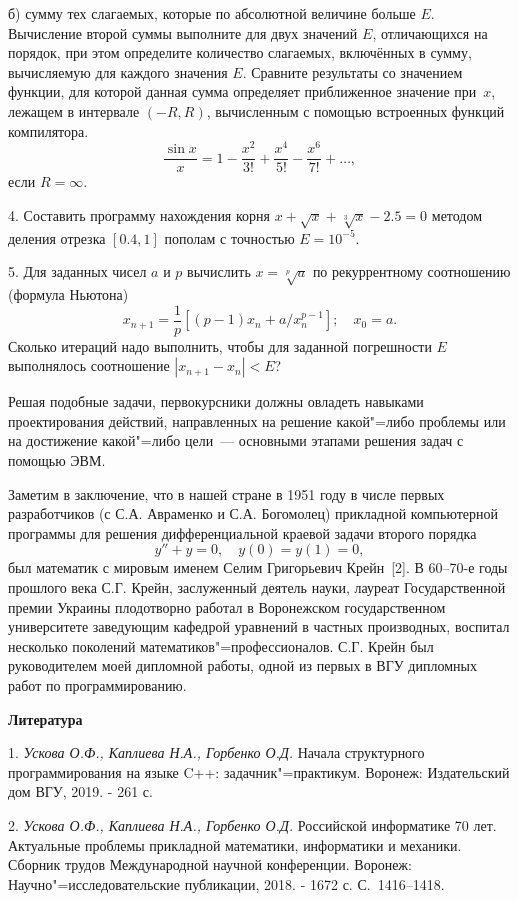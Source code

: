 б) сумму тех слагаемых, которые по абсолютной величине больше $E$. Вычисление второй суммы выполните для двух значений $E$,
отличающихся на порядок, при этом определите количество слагаемых, включённых в сумму, вычисляемую для каждого значения
$E$.
Сравните результаты со значением функции, для которой данная сумма определяет приближенное значение при \,$x$, лежащем в интервале
\linebreak
$(-R, R)$, вычисленным с помощью встроенных функций
ко\-мпилятора.
$$
\frac{\sin x}{x}=1-\frac{x^2}{3!}+\frac{x^4}{5!}-\frac{x^6}{7!}+\dots,
$$
если $R=\infty$.

4. Составить программу нахождения корня $x+\sqrt{x}+\sqrt[3]{x}-2.5=0$ методом деления отрезка $[0.4, 1]$ пополам с точностью
$E=10^{-5}$.

5. Для заданных чисел $a$ и $p$ вычислить $x=\sqrt[p]{a}$ по рекуррентному соотношению (формула Ньютона)
$$
x_{n+1}=\frac{1}{p}[(p-1)x_n+a/x_n^{p-1}]; \quad x_0=a.
$$
Сколько итераций надо выполнить, чтобы для заданной погрешности $E$ выполнялось соотношение $|x_{n+1}-x_n|<E$?

Решая подобные задачи, первокурсники должны овладеть навыками проектирования действий, направленных на решение какой"=либо
проблемы или на достижение какой"=либо цели~--- основными этапами решения задач с помощью ЭВМ.

Заметим в заключение, что в нашей стране в 1951 году в числе первых разработчиков (с С.А. Авраменко и С.А. Богомолец)
прикладной компьютерной программы для решения дифференциальной краевой задачи второго порядка
$$
y''+y=0, \quad y(0)=y(1)=0,
$$
был математик с мировым именем Селим Григорьевич \linebreak Крейн~[2].
В 60--70-е годы прошлого века С.Г. Крейн, заслуженный деятель
науки, лауреат Государственной премии Украины плодотворно работал в Воронежском государственном университете заведующим кафедрой
уравнений в частных производных, воспитал несколько поколений математиков"=профессионалов. С.Г. Крейн был руководителем
моей дипломной работы, одной из первых в ВГУ дипломных работ по программированию.

\smallskip \centerline {\bf Литература} \nopagebreak

1. {\it Ускова О.Ф., Каплиева Н.А., Горбенко О.Д.} Начала структурного программирования на языке C++: задачник"=практикум.
Воронеж: Издательский дом ВГУ, 2019. - 261 с.

2. {\it Ускова О.Ф., Каплиева Н.А., Горбенко О.Д.} Российской информатике 70 лет. Актуальные проблемы прикладной математики,
информатики и механики. Сборник трудов Международной научной конференции.
Воронеж: Научно"=исследовательские публикации, 2018. - 1672 с. С.~1416--1418.

